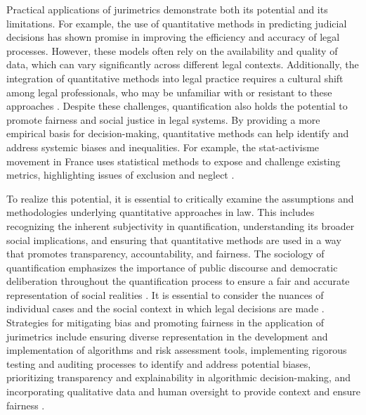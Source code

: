 Practical applications of jurimetrics demonstrate both its potential and its limitations. For example, the use of quantitative methods in predicting judicial decisions has shown promise in improving the efficiency and accuracy of legal processes. However, these models often rely on the availability and quality of data, which can vary significantly across different legal contexts. Additionally, the integration of quantitative methods into legal practice requires a cultural shift among legal professionals, who may be unfamiliar with or resistant to these approaches \cite{l2010de}. Despite these challenges, quantification also holds the potential to promote fairness and social justice in legal systems. By providing a more empirical basis for decision-making, quantitative methods can help identify and address systemic biases and inequalities. For example, the stat-activisme movement in France uses statistical methods to expose and challenge existing metrics, highlighting issues of exclusion and neglect \cite{10_1057_s41599_020_0396_5}.

To realize this potential, it is essential to critically examine the assumptions and methodologies underlying quantitative approaches in law. This includes recognizing the inherent subjectivity in quantification, understanding its broader social implications, and ensuring that quantitative methods are used in a way that promotes transparency, accountability, and fairness. The sociology of quantification emphasizes the importance of public discourse and democratic deliberation throughout the quantification process to ensure a fair and accurate representation of social realities \cite{10.1590/data.2022.65.3.267,10.3390/fi9040068}. It is essential to consider the nuances of individual cases and the social context in which legal decisions are made \cite{10.1007/s11186-021-09453-1,10.3390/fi9040068}. Strategies for mitigating bias and promoting fairness in the application of jurimetrics include ensuring diverse representation in the development and implementation of algorithms and risk assessment tools, implementing rigorous testing and auditing processes to identify and address potential biases, prioritizing transparency and explainability in algorithmic decision-making, and incorporating qualitative data and human oversight to provide context and ensure fairness \cite{10.1007/s11186-021-09453-1,10.3390/fi9040068}.

